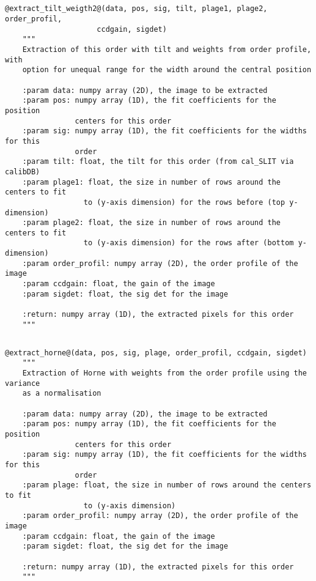 \subsection{}
\begin{lstlisting}[style=pythonstyle]
@extract_tilt_weigth2@(data, pos, sig, tilt, plage1, plage2, order_profil,
                     ccdgain, sigdet)
    """
    Extraction of this order with tilt and weights from order profile, with 
    option for unequal range for the width around the central position

    :param data: numpy array (2D), the image to be extracted
    :param pos: numpy array (1D), the fit coefficients for the position
                centers for this order
    :param sig: numpy array (1D), the fit coefficients for the widths for this
                order
    :param tilt: float, the tilt for this order (from cal_SLIT via calibDB)
    :param plage1: float, the size in number of rows around the centers to fit
                  to (y-axis dimension) for the rows before (top y-dimension)
    :param plage2: float, the size in number of rows around the centers to fit
                  to (y-axis dimension) for the rows after (bottom y-dimension)
    :param order_profil: numpy array (2D), the order profile of the image
    :param ccdgain: float, the gain of the image
    :param sigdet: float, the sig det for the image

    :return: numpy array (1D), the extracted pixels for this order
    """
\end{lstlisting}

\subsection{}
\begin{lstlisting}[style=pythonstyle]
@extract_horne@(data, pos, sig, plage, order_profil, ccdgain, sigdet)
    """
    Extraction of Horne with weights from the order profile using the variance
    as a normalisation

    :param data: numpy array (2D), the image to be extracted
    :param pos: numpy array (1D), the fit coefficients for the position
                centers for this order
    :param sig: numpy array (1D), the fit coefficients for the widths for this
                order
    :param plage: float, the size in number of rows around the centers to fit
                  to (y-axis dimension)
    :param order_profil: numpy array (2D), the order profile of the image
    :param ccdgain: float, the gain of the image
    :param sigdet: float, the sig det for the image

    :return: numpy array (1D), the extracted pixels for this order
    """

\end{lstlisting}

